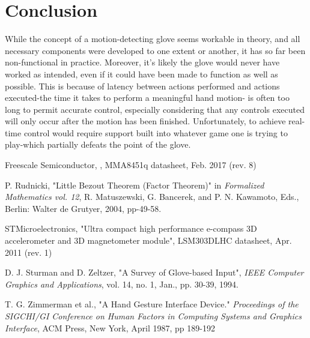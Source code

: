\documentclass{article}
\begin{document}
	\section{Conclusion}
	
	While the concept of a motion-detecting glove seems workable in theory, and all necessary components were developed to one extent or another, it has so far been non-functional in practice. Moreover, it's likely the glove would never have worked as intended, even if it could have been made to function as well as possible. This is because of latency between actions performed and actions executed-the time it takes to perform a meaningful hand motion- is often too long to permit accurate control, especially considering that any controls executed will only occur after the motion has been finished. Unfortunately, to achieve real-time control would require support built into whatever game one is trying to play-which partially defeats the point of the glove. \newpage
	
	\begin{thebibliography}{9}
		Freescale Semiconductor, , MMA8451q datasheet, Feb. 2017 (rev. 8)
		
		P. Rudnicki, "Little Bezout Theorem (Factor Theorem)" in 
		\textit{Formalized Mathematics vol. 12},
		R. Matuszewski, G. Bancerek, and P. N. Kawamoto, Eds., 
		Berlin: Walter de Grutyer, 2004, pp-49-58.
		
		STMicroelectronics, "Ultra compact high performance e-compass 3D accelerometer and 3D magnetometer module", LSM303DLHC datasheet, Apr. 2011 (rev. 1)
		
		D. J. Sturman and D. Zeltzer, "A Survey of Glove-based Input", 
		\textit{IEEE Computer Graphics and Applications}, vol. 14, no. 1, Jan., pp. 30-39, 1994.
		
		T. G. Zimmerman et al., "A Hand Gesture Interface Device."
		\textit{Proceedings of the SIGCHI/GI Conference on Human Factors in Computing Systems and Graphics Interface}, ACM Press, New York, April 1987, pp 189-192
	\end{thebibliography}
\end{document}
